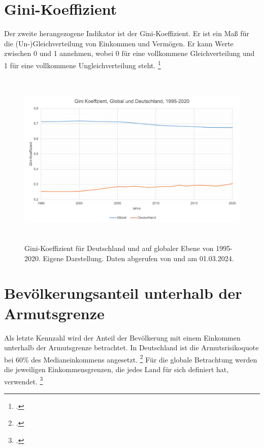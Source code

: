\section{Gini-Koeffizient}

Der zweite herangezogene Indikator ist der Gini-Koeffizient. Er ist ein Maß für die (Un-)Gleichverteilung von Einkommen und Vermögen. Er kann Werte zwischen 0 und 1 annehmen, wobei 0 für eine vollkommene Gleichverteilung und 1 für eine vollkommene Ungleichverteilung steht. \footcite[Vgl.][]{gini_definition_diw_2024}

\begin{figure}[H]
    \centering
    \includegraphics[height=8.5cm]{Bilder/Gini-Koeffizient.png}
    \caption[Gini-Koeffizient, Deutschland und global, 1995-2020]{Gini-Koeffizient für Deutschland und auf globaler Ebene von 1995-2020. Eigene Darstellung. Daten abgerufen von \cite[][, S.56 (global)]{wir_2022} und \cite[][(Deutschland)]{bmas_arb_gini_2020} am 01.03.2024.}
    \label{fig:iso_norm}
\end{figure}

\section{Bevölkerungsanteil unterhalb der Armutsgrenze}

Als letzte Kennzahl wird der Anteil der Bevölkerung mit einem Einkommen unterhalb der Armutsgrenze betrachtet. In Deutschland ist die Armutsrisikoquote bei 60\% des Medianeinkommens angesetzt. \footcite[Vgl.][]{bmas_arb_armutsrisikoquote_2023} Für die globale Betrachtung werden die jeweiligen Einkommensgrenzen, die jedes Land für sich definiert hat, verwendet. \footcite[Vgl.][]{wb_armutsquote_global_2022}